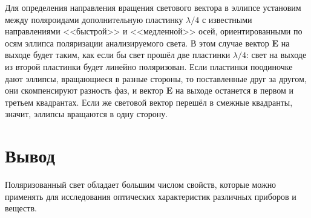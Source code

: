 \documentclass[a4paper]{article}
\begin{document}
Для определения направления вращения светового вектора в эллипсе
установим между поляроидами дополнительную пластинку $\lambda/4$ с известными направлениями <<быстрой>> и <<медленной>> осей, ориентированными по осям эллипса поляризации анализируемого света.
В этом случае вектор $\mathbf{E}$ на выходе будет таким, как если бы свет прошёл две пластинки $\lambda/4$: свет на выходе из второй пластинки будет линейно поляризован. Если пластинки поодиночке дают эллипсы, вращающиеся в разные стороны, то поставленные друг за другом, они скомпенсируют разность фаз, и вектор $\mathbf{E}$ на выходе останется в первом и третьем квадрантах. Если же световой вектор перешёл в смежные квадранты, значит, эллипсы вращаются в одну сторону.

\section{Вывод}

Поляризованный свет обладает большим числом свойств, которые можно
применять для исследования оптических характеристик различных приборов и веществ.
\end{document}
